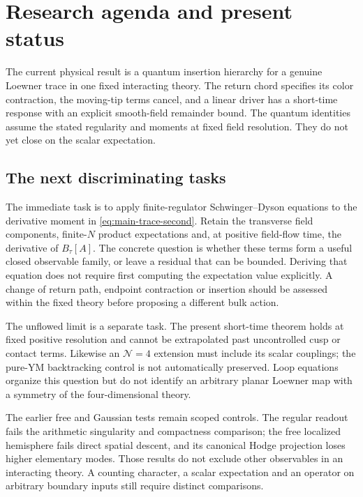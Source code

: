 \section{Research agenda and present status}\label{sec:outlook}

The current physical result is a quantum insertion hierarchy for a genuine
Loewner trace in one fixed interacting theory. The return chord specifies
its color contraction, the moving-tip terms cancel, and a linear driver
has a short-time response with an explicit smooth-field remainder bound.
The quantum identities assume the stated regularity and moments at fixed
field resolution. They do not yet close on the scalar expectation.

\subsection{The next discriminating tasks}

The immediate task is to apply finite-regulator Schwinger--Dyson equations
to the derivative moment in \eqref{eq:main-trace-second}. Retain the
transverse field components, finite-$N$ product expectations and, at
positive field-flow time, the derivative of $B_\tau[A]$. The concrete
question is whether these terms form a useful closed observable family,
or leave a residual that can be bounded. Deriving that equation does not
require first computing the expectation value explicitly. A change of
return path, endpoint contraction or insertion should be assessed within
the fixed theory before proposing a different bulk action.

The unflowed limit is a separate task. The present short-time theorem
holds at fixed positive resolution and cannot be extrapolated past
uncontrolled cusp or contact terms. Likewise an $\mathcal N=4$ extension
must include its scalar couplings; the pure-YM backtracking control is
not automatically preserved. Loop equations organize this question but
do not identify an arbitrary planar Loewner map with a symmetry of the
four-dimensional theory.

The earlier free and Gaussian tests remain scoped controls. The regular
readout fails the arithmetic singularity and compactness comparison;
the free localized hemisphere fails direct spatial descent, and its
canonical Hodge projection loses higher elementary modes. Those results
do not exclude other observables in an interacting theory. A counting
character, a scalar expectation and an operator on arbitrary boundary
inputs still require distinct comparisons.

